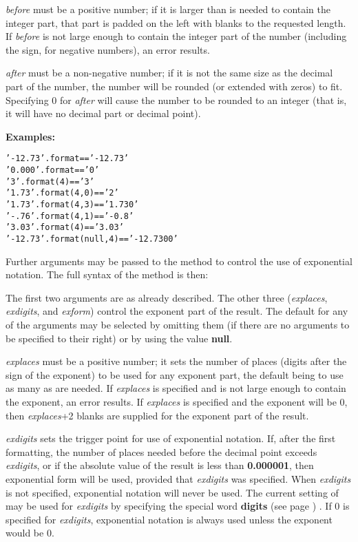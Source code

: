 \begin{description}
\emph{before} must be a positive number; if it is larger than is
needed to contain the integer part, that part is padded on the left with
blanks to the requested length.
If \emph{before} is not large enough to contain the integer part
of the number (including the sign, for negative numbers), an error
results.
 
\emph{after} must be a non-negative number; if it is not the same
size as the decimal part of the number, the number will be rounded (or
extended with zeros) to fit.  Specifying 0 for \emph{after} will
cause the number to be rounded to an integer (that is, it will have no
decimal part or decimal point).
 
\textbf{Examples:}
\begin{alltt}
' - 12.73'.format         == '-12.73'
'0.000'.format            == '0'
'3'.format(4)             == '   3'
'1.73'.format(4,0)        == '   2'
'1.73'.format(4,3)        == '   1.730'
'-.76'.format(4,1)        == '  -0.8'
'3.03'.format(4)          == '   3.03'
' - 12.73'.format(null,4) == '-12.7300'
\end{alltt}
 
Further arguments may be passed to the  method to control
the use of exponential notation.
The full syntax of the method is then:
 
 The first two arguments are as already described.  The other three
(\emph{explaces}, \emph{exdigits}, and \emph{exform})
control the exponent part of the result.  The default for any of the
arguments may be selected by omitting them (if there are no arguments to
be specified to their right) or by using the value \textbf{null}.
 
\emph{explaces} must be a positive number; it sets the number of
places (digits after the sign of the exponent) to be used for any
exponent part, the default being to use as many as are needed.
If \emph{explaces} is specified and is not large enough to contain
the exponent, an error results.
If \emph{explaces} is specified and the exponent will be 0,
then \emph{explaces}+2 blanks are supplied for the exponent
part of the result.
 
\emph{exdigits} sets the trigger point for use of exponential
notation.
If, after the first formatting, the number of places needed before the
decimal point exceeds \emph{exdigits}, or if the absolute value of
the result is less than \textbf{0.000001}, then exponential form will
be used, provided that \emph{exdigits} was specified.
When \emph{exdigits} is not specified, exponential notation
will never be used.
The current setting of  may be used for
\emph{exdigits} by specifying the special word
 \textbf{digits} (see page \pageref{refswdigit}) .
If 0 is specified for \emph{exdigits}, exponential
notation is always used unless the exponent would be 0.
 

\end{description}
